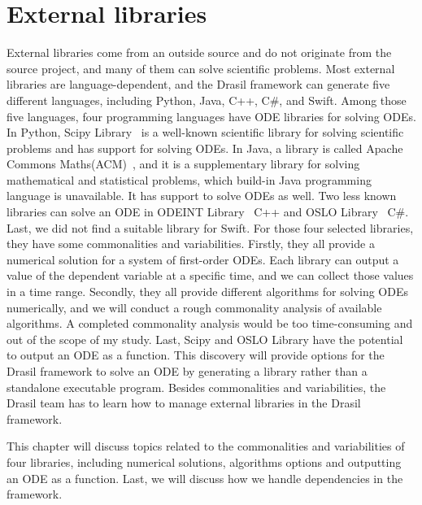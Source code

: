 \chapter{External libraries}
External libraries come from an outside source and do not originate from the source project, and many of them can solve scientific problems. Most external libraries are language-dependent, and the Drasil framework can generate five different languages, including Python, Java, C++, C\#, and Swift. Among those five languages, four programming languages have ODE libraries for solving ODEs. In Python, Scipy Library~\citep{scipy} is a well-known scientific library for solving scientific problems and has support for solving ODEs. In Java, a library is called Apache Commons Maths(ACM)~\citep{apache}, and it is a supplementary library for solving mathematical and statistical problems, which build-in Java programming language is unavailable. It has support to solve ODEs as well. Two less known libraries can solve an ODE in ODEINT Library~\citep{odeint} C++ and OSLO Library~\citep{oslo} C\#. Last, we did not find a suitable library for Swift. For those four selected libraries, they have some commonalities and variabilities. Firstly, they all provide a numerical solution for a system of first-order ODEs. Each library can output a value of the dependent variable at a specific time, and we can collect those values in a time range. Secondly, they all provide different algorithms for solving ODEs numerically, and we will conduct a rough commonality analysis of available algorithms. A completed commonality analysis would be too time-consuming and out of the scope of my study. Last, Scipy and OSLO Library have the potential to output an ODE as a function. This discovery will provide options for the Drasil framework to solve an ODE by generating a library rather than a standalone executable program. Besides commonalities and variabilities, the Drasil team has to learn how to manage external libraries in the Drasil framework.

This chapter will discuss topics related to the commonalities and variabilities of four libraries, including numerical solutions, algorithms options and outputting an ODE as a function. Last, we will discuss how we handle dependencies in the framework.

